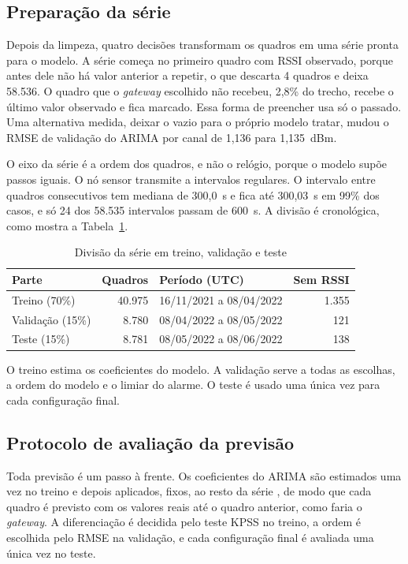 \subsection{Preparação da série}
\label{subsec:ml-preparacao}

Depois da limpeza, quatro decisões transformam os quadros em uma série pronta
para o modelo. A série começa no primeiro quadro com RSSI observado, porque
antes dele não há valor anterior a repetir, o que descarta 4 quadros e deixa
58.536. O quadro que o \textit{gateway} escolhido não recebeu, 2,8\% do
trecho, recebe o último valor observado e fica marcado. Essa forma de
preencher usa só o passado. Uma alternativa medida, deixar o vazio para o
próprio modelo tratar, mudou o RMSE de validação do ARIMA por canal de
1,136 para 1,135~dBm.

O eixo da série é a ordem dos quadros, e não o relógio, porque o modelo supõe
passos iguais. O nó sensor transmite a intervalos regulares. O intervalo entre
quadros consecutivos tem mediana de 300,0~s e fica até 300,03~s em 99\% dos
casos, e só 24 dos 58.535 intervalos passam de 600~s. A divisão é cronológica,
como mostra a Tabela~\ref{tab:ml-divisao}.

\begin{table}[htb]
	\centering
	\caption{Divisão da série em treino, validação e teste}
	\label{tab:ml-divisao}
	\begin{tabular}{lrlr}
		\hline
		\textbf{Parte} & \textbf{Quadros} & \textbf{Período (UTC)} & \textbf{Sem RSSI} \\
		\hline
		Treino (70\%) & 40.975 & 16/11/2021 a 08/04/2022 & 1.355 \\
		Validação (15\%) & 8.780 & 08/04/2022 a 08/05/2022 & 121 \\
		Teste (15\%) & 8.781 & 08/05/2022 a 08/06/2022 & 138 \\
		\hline
	\end{tabular}
\end{table}

O treino estima os coeficientes do modelo. A validação serve a todas as
escolhas, a ordem do modelo e o limiar do alarme. O teste é usado uma única vez
para cada configuração final.

\subsection{Protocolo de avaliação da previsão}
\label{subsec:ml-protocolo}

Toda previsão é um passo à frente. Os coeficientes do ARIMA são estimados uma
vez no treino e depois aplicados, fixos, ao resto da série
\cite{statsmodelsapply}, de modo que cada quadro é previsto com os valores
reais até o quadro anterior, como faria o \textit{gateway}. A diferenciação é
decidida pelo teste KPSS no treino, a ordem é escolhida pelo RMSE na validação,
e cada configuração final é avaliada uma única vez no teste.

